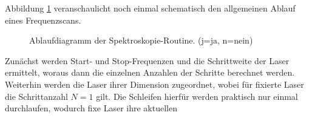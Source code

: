 Abbildung \ref{fig:spektroskopie_ablaufdiagramm} veranschaulicht noch einmal
schematisch den allgemeinen Ablauf eines Frequenzscans.
\begin{figure}[hp]
 	\centering
	\caption[Spektroskopie -
	Software-Ablaufdiagramm]{Ablaufdiagramm der Spektroskopie-Routine. (j=ja,
	n=nein)}
	\label{fig:spektroskopie_ablaufdiagramm}
\end{figure}
Zunächst werden Start- und Stop-Frequenzen und die Schrittweite der Laser
ermittelt, woraus dann die einzelnen Anzahlen der Schritte berechnet werden.
Weiterhin werden die Laser ihrer Dimension zugeordnet, wobei für fixierte
Laser die Schrittanzahl $N=1$ gilt. Die Schleifen hierfür werden
praktisch nur einmal durchlaufen, wodurch fixe Laser ihre aktuellen
